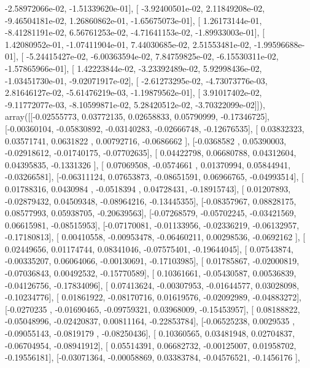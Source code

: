 \documentclass{article}
\begin{document}
         -2.58972066e-02,  -1.51339620e-01],
       [ -3.92400501e-02,   2.11849208e-02,  -9.46504181e-02,
          1.26860862e-01,  -1.65675073e-01],
       [  1.26173144e-01,  -8.41281191e-02,   6.56761253e-02,
         -4.71641153e-02,  -1.89933003e-01],
       [  1.42080952e-01,  -1.07411904e-01,   7.44030685e-02,
          2.51553481e-02,  -1.99596688e-01],
       [ -5.24415427e-02,  -6.00363594e-02,   7.84759825e-02,
         -6.15530311e-02,  -1.57865966e-01],
       [  1.42223844e-02,  -3.23392489e-02,   5.92998436e-02,
         -1.03451730e-01,  -9.02071917e-02],
       [ -2.61273295e-02,  -4.73073776e-03,   2.81646127e-02,
         -5.61476219e-03,  -1.19879562e-01],
       [  3.91017402e-02,  -9.11772077e-03,  -8.10599871e-02,
          5.28420512e-02,  -3.70322099e-02]]), array([[-0.02555773,  0.03772135,  0.02658833,  0.05790999, -0.17346725],
       [-0.00360104, -0.05830892, -0.03140283, -0.02666748, -0.12676535],
       [ 0.03832323,  0.03571741,  0.0631822 ,  0.00792716, -0.0686662 ],
       [-0.0368582 ,  0.05390003, -0.02918612, -0.01740175, -0.07702635],
       [ 0.04422798,  0.06680788,  0.04312604,  0.04395835, -0.1331326 ],
       [ 0.07069508, -0.0574661 ,  0.01370994,  0.05844941, -0.03266581],
       [-0.06311124,  0.07653873, -0.08651591,  0.06966765, -0.04993514],
       [ 0.01788316,  0.0430984 , -0.0518394 ,  0.04728431, -0.18915743],
       [ 0.01207893, -0.02879432,  0.04509348, -0.08964216, -0.13445355],
       [-0.08357967,  0.08828175,  0.08577993,  0.05938705, -0.20639563],
       [-0.07268579, -0.05702245, -0.03421569,  0.06615981, -0.08515953],
       [-0.07170081, -0.01133956, -0.02336219, -0.06132957, -0.17180813],
       [ 0.00410558, -0.00953478, -0.06460211,  0.00298536, -0.0692162 ],
       [ 0.02449656,  0.01174744,  0.08341046, -0.07575401, -0.19644045],
       [ 0.07543874, -0.00335207,  0.06064066, -0.00130691, -0.17103985],
       [ 0.01785867, -0.02000819, -0.07036843,  0.00492532, -0.15770589],
       [ 0.10361661, -0.05430587,  0.00536839, -0.04126756, -0.17834096],
       [ 0.07413624, -0.00307953, -0.01644577,  0.03028098, -0.10234776],
       [ 0.01861922, -0.08170716,  0.01619576, -0.02092989, -0.04883272],
       [-0.0270235 , -0.01690465, -0.09759321,  0.03968009, -0.15453957],
       [ 0.08188822, -0.05048996, -0.02420837,  0.00811164, -0.22853784],
       [-0.06525238,  0.0029535 , -0.09055143, -0.0819179 , -0.08250436],
       [ 0.10360565,  0.03481948,  0.02704837, -0.06704954, -0.08941912],
       [ 0.05514391,  0.06682732, -0.00125007,  0.01958702, -0.19556181],
       [-0.03071364, -0.00058869,  0.03383784, -0.04576521, -0.1456176 ],
\end{document}
